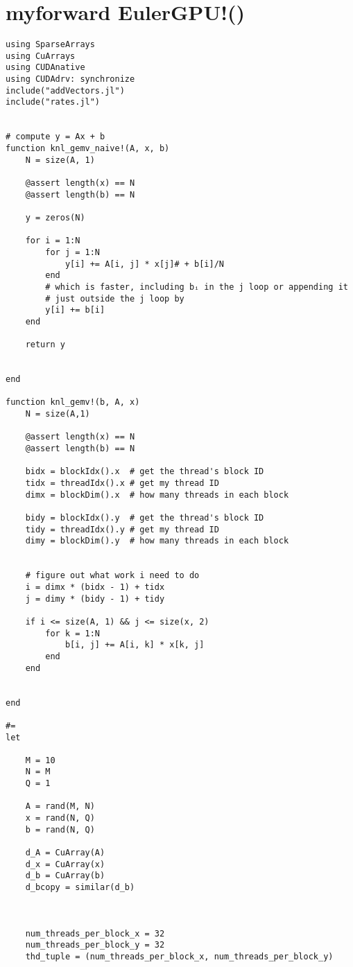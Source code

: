 \documentclass[12pt]{article}
\begin{document}
\section*{my\textunderscore forward \textunderscore EulerGPU!()}
\begin{verbatim}
using SparseArrays
using CuArrays
using CUDAnative
using CUDAdrv: synchronize
include("addVectors.jl")
include("rates.jl")


# compute y = Ax + b
function knl_gemv_naive!(A, x, b)
    N = size(A, 1)

    @assert length(x) == N
    @assert length(b) == N

    y = zeros(N)

    for i = 1:N
        for j = 1:N
            y[i] += A[i, j] * x[j]# + b[i]/N
        end
        # which is faster, including bᵢ in the j loop or appending it
        # just outside the j loop by
        y[i] += b[i]
    end

    return y

    
end

function knl_gemv!(b, A, x)
    N = size(A,1)

    @assert length(x) == N
    @assert length(b) == N

    bidx = blockIdx().x  # get the thread's block ID
    tidx = threadIdx().x # get my thread ID
    dimx = blockDim().x  # how many threads in each block

    bidy = blockIdx().y  # get the thread's block ID
    tidy = threadIdx().y # get my thread ID
    dimy = blockDim().y  # how many threads in each block


    # figure out what work i need to do
    i = dimx * (bidx - 1) + tidx
    j = dimy * (bidy - 1) + tidy

    if i <= size(A, 1) && j <= size(x, 2)
        for k = 1:N
            b[i, j] += A[i, k] * x[k, j]
        end
    end
    

end

#=
let

    M = 10
    N = M
    Q = 1

    A = rand(M, N)
    x = rand(N, Q)
    b = rand(N, Q)

    d_A = CuArray(A)
    d_x = CuArray(x)
    d_b = CuArray(b)
    d_bcopy = similar(d_b)



    num_threads_per_block_x = 32
    num_threads_per_block_y = 32
    thd_tuple = (num_threads_per_block_x, num_threads_per_block_y)


\end{verbatim}
\end{document}
